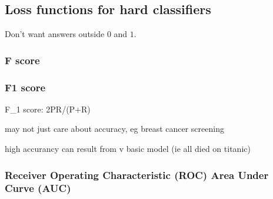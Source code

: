 
\subsection{Loss functions for hard classifiers}

Don't want answers outside \(0\) and \(1\).

\subsubsection{F score}

\subsubsection{F1 score}

F_1 score: 2PR/(P+R)

may not just care about accuracy, eg breast cancer screening

high accurancy can result from v basic model (ie all died on titanic)

\subsubsection{Receiver Operating Characteristic (ROC) Area Under Curve (AUC)}

